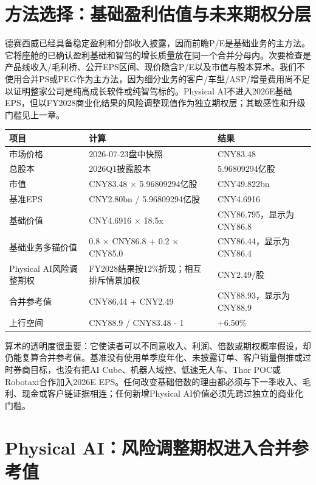\section{方法选择：基础盈利估值与未来期权分层}

德赛西威已经具备稳定盈利和分部收入披露，因而前瞻P/E是基础业务的主方法。它将座舱的已确认盈利基础和智驾的增长质量放在同一个合并分母内。次要检查是产品线收入/毛利桥、公开EPS区间、现价隐含P/E以及市值与股本算术。我们不使用合并PS或PEG作为主方法，因为细分业务的客户/车型/ASP/增量费用尚不足以证明整家公司是纯高成长软件或纯智驾标的。Physical AI不进入2026E基础EPS，但以FY2028商业化结果的风险调整现值作为独立期权层；其敏感性和升级门槛见上一章。

\begin{exhibitbox}[价格、股本和估值算术]
\small
\begin{tabularx}{\textwidth}{L{3.2cm}Y Y}
\toprule
项目 & 计算 & 结果 \\
\midrule
市场价格 & 2026-07-23盘中快照 & CNY83.48 \\
总股本 & 2026Q1披露股本 & 5.96809294亿股 \\
市值 & CNY83.48 $\times$ 5.96809294亿股 & CNY49.822bn \\
基准EPS & CNY2.80bn / 5.96809294亿股 & CNY4.6916 \\
基础价值 & CNY4.6916 $\times$ 18.5x & CNY86.795，显示为CNY86.8 \\
基础业务多锚价值 & 0.8 $\times$ CNY86.8 + 0.2 $\times$ CNY85.0 & CNY86.44，显示为CNY86.4 \\
Physical AI风险调整期权 & FY2028结果按12\%折现；相互排斥情景加权 & CNY2.49/股 \\
合并参考值 & CNY86.44 + CNY2.49 & CNY88.93，显示为CNY88.9 \\
上行空间 & CNY88.9 / CNY83.48 - 1 & +6.50\% \\
\bottomrule
\end{tabularx}
\end{exhibitbox}

算术的透明度很重要：它使读者可以不同意收入、利润、倍数或期权概率假设，却仍能复算合并参考值。基准没有使用单季度年化、未披露订单、客户销量倒推或过时券商目标，也没有把AI Cube、机器人域控、低速无人车、Thor POC或Robotaxi合作加入2026E EPS。任何改变基础倍数的理由都必须与下一季收入、毛利、现金或客户链证据相连；任何新增Physical AI价值必须先跨过独立的商业化门槛。

\section{Physical AI：风险调整期权进入合并参考值}

